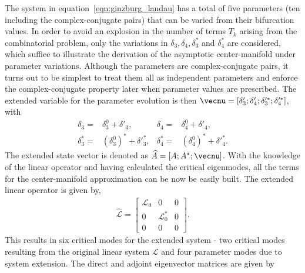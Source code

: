 The system in equation~\eqref{eqn:ginzburg_landau} has a total of five parameters (ten including the complex-conjugate pairs) that can be varied from their bifurcation values. In order to avoid an explosion in the number of terms $T_{k}$ arising from the combinatorial problem, only the variations in $\delta_{3},\delta_{4},\delta^{*}_{3}$ and $\delta^{*}_{4}$ are considered, which suffice to illustrate the derivation of the asymptotic center-manifold under parameter variations. Although the parameters are complex-conjugate pairs, it turns out to be simplest to treat them all as independent parameters and enforce the complex-conjugate property later when parameter values are prescribed. The extended variable for the parameter evolution is then $\vecnu = [\delta'_{3};\delta'_{4};\delta'^{*}_{3};\delta'^{*}_{4}]$, with 
\begin{align}
	\delta_{3} =& \delta^{0}_{3} + \delta'_{3},& \delta_{4} =& \delta^{0}_{4} + \delta'_{4}, \nonumber \\
	\delta^{*}_{3} =& (\delta^{0}_{3})^{*} + \delta'^{*}_{3}, &\delta^{*}_{4} =& (\delta^{0}_{4})^{*} + \delta'^{*}_{4}. \nonumber
\end{align}
The extended state vector is denoted as $\widehat{A} = [A; A^{*}; \vecnu]$. With the knowledge of the linear operator and having calculated the critical eigenmodes, all the terms for the center-manifold approximation can be now be easily built. 
The extended linear operator is given by,
 \begin{align}
 	\mathcal{\widehat{L}} = \begin{bmatrix}
 		\mathcal{L}_{0} 	   &	0										&	0 \\
 		0									  & \mathcal{L}^{*}_{0}		&   0 \\
 		0									  & 0											&  0
 	\end{bmatrix}. \nonumber
 \end{align}
This results in six critical modes for the extended system - two critical modes resulting from the original linear system $\mathcal{L}$ and four parameter modes due to system extension. The direct and adjoint eigenvector matrices are given by
